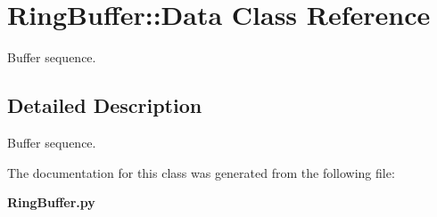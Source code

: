 \section{Ring\-Buffer::Data Class Reference}
\label{classRingBuffer_1_1Data}
Buffer sequence.  




\subsection{Detailed Description}
Buffer sequence. 



The documentation for this class was generated from the following file:\begin{CompactItemize}
\item 
{\bf Ring\-Buffer.py}\end{CompactItemize}
